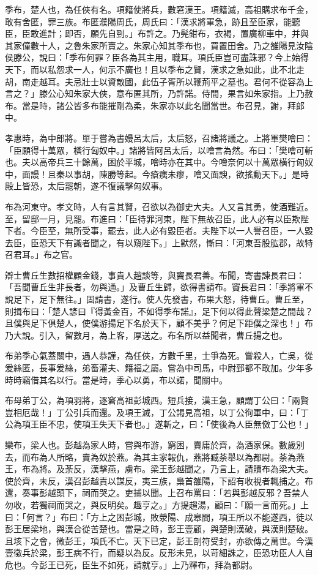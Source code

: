 
\begin{pinyinscope}
季布，楚人也，為任俠有名。項籍使將兵，數窘漢王。項籍滅，高祖購求布千金，敢有舍匿，罪三族。布匿濮陽周氏，周氏曰：「漢求將軍急，跡且至臣家，能聽臣，臣敢進計；即否，願先自剄。」布許之。乃髡鉗布，衣褐，置廣柳車中，并與其家僮數十人，之魯朱家所賣之。朱家心知其季布也，買置田舍。乃之雒陽見汝陰侯滕公，說曰：「季布何罪？臣各為其主用，職耳。項氏臣豈可盡誅邪？今上始得天下，而以私怨求一人，何示不廣也！且以季布之賢，漢求之急如此，此不北走胡，南走越耳。夫忌壯士以資敵國，此伍子胥所以鞭荊平之墓也。君何不從容為上言之？」滕公心知朱家大俠，意布匿其所，乃許諾。侍間，果言如朱家指。上乃赦布。當是時，諸公皆多布能摧剛為柔，朱家亦以此名聞當世。布召見，謝，拜郎中。

孝惠時，為中郎將。單于嘗為書嫚呂太后，太后怒，召諸將議之。上將軍樊噲曰：「臣願得十萬眾，橫行匈奴中。」諸將皆阿呂太后，以噲言為然。布曰：「樊噲可斬也。夫以高帝兵三十餘萬，困於平城，噲時亦在其中。今噲奈何以十萬眾橫行匈奴中，面謾！且秦以事胡，陳勝等起。今瘡痍未瘳，噲又面諛，欲搖動天下。」是時殿上皆恐，太后罷朝，遂不復議擊匈奴事。

布為河東守。孝文時，人有言其賢，召欲以為御史大夫。人又言其勇，使酒難近。至，留邸一月，見罷。布進曰：「臣待罪河東，陛下無故召臣，此人必有以臣欺陛下者。今臣至，無所受事，罷去，此人必有毀臣者。夫陛下以一人譽召臣，一人毀去臣，臣恐天下有識者聞之，有以窺陛下。」上默然，慚曰：「河東吾股肱郡，故特召君耳。」布之官。

辯士曹丘生數招權顧金錢，事貴人趙談等，與竇長君善。布聞，寄書諫長君曰：「吾聞曹丘生非長者，勿與通。」及曹丘生歸，欲得書請布。竇長君曰：「季將軍不說足下，足下無往。」固請書，遂行。使人先發書，布果大怒，待曹丘。曹丘至，則揖布曰：「楚人諺曰『得黃金百，不如得季布諾』，足下何以得此聲梁楚之間哉？且僕與足下俱楚人，使僕游揚足下名於天下，顧不美乎？何足下距僕之深也！」布乃大說。引入，留數月，為上客，厚送之。布名所以益聞者，曹丘揚之也。

布弟季心氣蓋關中，遇人恭謹，為任俠，方數千里，士爭為死。嘗殺人，亡吳，從爰絲匿，長事爰絲，弟畜灌夫、籍福之屬。嘗為中司馬，中尉郅都不敢加。少年多時時竊借其名以行。當是時，季心以勇，布以諾，聞關中。

布母弟丁公，為項羽將，逐窘高祖彭城西。短兵接，漢王急，顧謂丁公曰：「兩賢豈相厄哉！」丁公引兵而還。及項王滅，丁公謁見高祖，以丁公徇軍中，曰：「丁公為項王臣不忠，使項王失天下者也。」遂斬之，曰：「使後為人臣無傚丁公也！」

欒布，梁人也。彭越為家人時，嘗與布游，窮困，賣庸於齊，為酒家保。數歲別去，而布為人所略，賣為奴於燕。為其主家報仇，燕將臧荼舉以為都尉。荼為燕王，布為將。及荼反，漢擊燕，虜布。梁王彭越聞之，乃言上，請贖布為梁大夫。使於齊，未反，漢召彭越責以謀反，夷三族，梟首雒陽，下詔有收視者輒捕之。布還，奏事彭越頭下，祠而哭之。吏捕以聞。上召布罵曰：「若與彭越反邪？吾禁人勿收，若獨祠而哭之，與反明矣。趣亨之。」方提趨湯，顧曰：「願一言而死。」上曰：「何言？」布曰：「方上之困彭城，敗滎陽、成皋間，項王所以不能遂西，徒以彭王居梁地，與漢合從苦楚也。當是之時，彭王壹顧，與楚則漢破，與漢則楚破。且垓下之會，微彭王，項氏不亡。天下已定，彭王剖符受封，亦欲傳之萬世。今漢壹徵兵於梁，彭王病不行，而疑以為反。反形未見，以苛細誅之，臣恐功臣人人自危也。今彭王已死，臣生不如死，請就亨。」上乃釋布，拜為都尉。


\end{pinyinscope}
